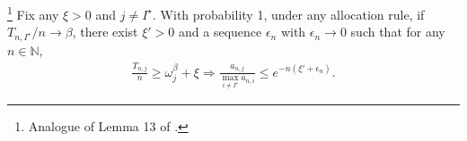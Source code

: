 \begin{lemma}\label{lemma:over_allocation}
\begin{leftbar}\footnote{Analogue of Lemma 13 of \cite{russo2016ttts}.}
Fix any $\xi > 0$ and $j \neq I^\star$. With probability 1, under any allocation rule, if $T_{n,I^\star}/n \rightarrow \beta$, there exist $\xi' > 0$ and a sequence $\epsilon_n$ with $\epsilon_n \rightarrow 0$ such that for any $n \in \mathbb{N}$, 
	\begin{align*}
	\frac{T_{n,j}}{n} \geq \omega_j^\beta + \xi \Rightarrow \frac{a_{n,j}}{\max_{i \neq I^\star} a_{n,i}} \leq e^{-n (\xi' + \epsilon_n)}.
	\end{align*}
\end{leftbar}
\end{lemma}



